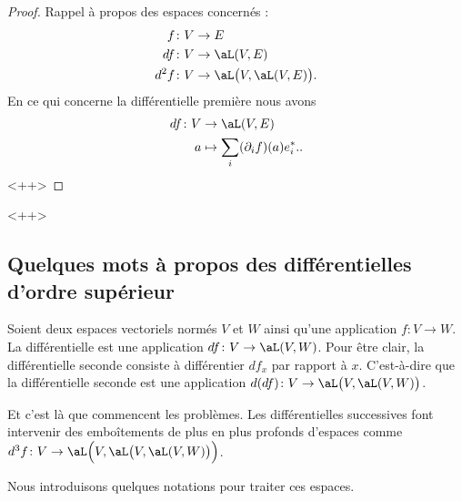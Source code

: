 \begin{proof}
	Rappel à propos des espaces concernés :
	\begin{subequations}
		\begin{align}
			f    & \colon V\to E                          \\
			df   & \colon V\to \aL(V,E)                   \\
			d^2f & \colon V\to \aL\big( V,\aL(V,E) \big).
		\end{align}
	\end{subequations}
	En ce qui concerne la différentielle première nous avons
	\begin{equation}
		\begin{aligned}
			df\colon V & \to \aL(V,E)                          \\
			a          & \mapsto \sum_i(\partial_if)(a)e^*_i..
		\end{aligned}
	\end{equation}<++>
\end{proof}<++>

\subsection{Quelques mots à propos des différentielles d'ordre supérieur}

Soient deux espaces vectoriels normés \( V\) et \( W\) ainsi qu'une application \( f\colon V\to W\). La différentielle est une application \( df\colon V\to \aL(V,W)\). Pour être clair, la différentielle seconde consiste à différentier \( df_x\) par rapport à \( x\). C'est-à-dire que la différentielle seconde est une application \( d(df)\colon V\to \aL\big( V,\aL(V,W) \big)\).

Et c'est là que commencent les problèmes. Les différentielles successives font intervenir des emboîtements de plus en plus profonds d'espaces comme \( d^3f\colon V\to \aL\Big( V,\aL\big( V,\aL(V,W) \big) \Big)\).

Nous introduisons quelques notations pour traiter ces espaces.

